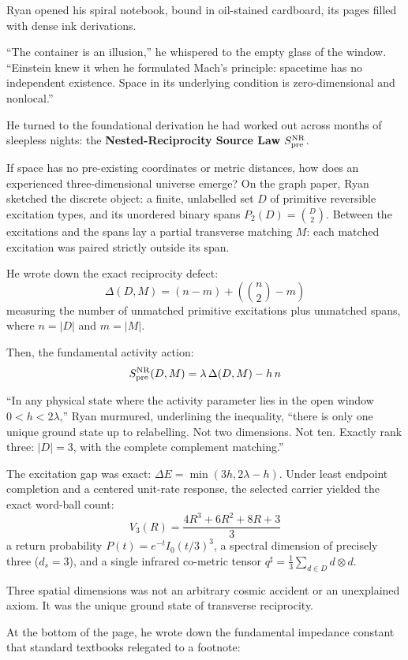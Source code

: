 \documentclass[12pt,twoside,openright]{book}
\begin{document}
Ryan opened his spiral notebook, bound in oil-stained cardboard, its
pages filled with dense ink derivations.

``The container is an illusion,'' he whispered to the empty glass of the
window. ``Einstein knew it when he formulated Mach's principle:
spacetime has no independent existence. Space in its underlying
condition is zero-dimensional and nonlocal.''

He turned to the foundational derivation he had worked out across months
of sleepless nights: the \textbf{Nested-Reciprocity Source Law}
\(S_{\rm pre}^{\rm NR}\).

If space has no pre-existing coordinates or metric distances, how does
an experienced three-dimensional universe emerge? On the graph paper,
Ryan sketched the discrete object: a finite, unlabelled set \(D\) of
primitive reversible excitation types, and its unordered binary spans
\(P_2(D) = \binom{D}{2}\). Between the excitations and the spans lay a
partial transverse matching \(M\): each matched excitation was paired
strictly outside its span.

He wrote down the exact reciprocity defect:
\[\Delta(D, M) = (n - m) + \left( \binom{n}{2} - m \right)\] measuring
the number of unmatched primitive excitations plus unmatched spans,
where \(n = |D|\) and \(m = |M|\).

Then, the fundamental activity action:
\[S_{\rm pre}^{\rm NR}(D, M) = \lambda \, \Delta(D, M) - h \, n\]

``In any physical state where the activity parameter lies in the open
window \(0 < h < 2\lambda\),'' Ryan murmured, underlining the
inequality, ``there is only one unique ground state up to relabelling.
Not two dimensions. Not ten. Exactly rank three: \(|D| = 3\), with the
complete complement matching.''

The excitation gap was exact: \(\Delta E = \min(3h, 2\lambda - h)\).
Under least endpoint completion and a centered unit-rate response, the
selected carrier yielded the exact word-ball count:
\[V_3(R) = \frac{4R^3 + 6R^2 + 8R + 3}{3}\] a return probability
\(P(t) = e^{-t} I_0(t/3)^3\), a spectral dimension of precisely three
(\(d_s = 3\)), and a single infrared co-metric tensor
\(q^\sharp = \frac{1}{3}\sum_{d \in D} d \otimes d\).

Three spatial dimensions was not an arbitrary cosmic accident or an
unexplained axiom. It was the unique ground state of transverse
reciprocity.

At the bottom of the page, he wrote down the fundamental impedance
constant that standard textbooks relegated to a footnote:
\end{document}

